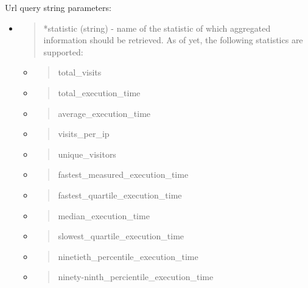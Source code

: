 Url query string parameters:

\begin{itemize}
\item
  \begin{quote}
  *statistic (string) - name of the statistic of which aggregated
  information should be retrieved. As of yet, the following statistics
  are supported:
  \end{quote}

  \begin{itemize}
  \item
    \begin{quote}
    total\_visits
    \end{quote}
  \item
    \begin{quote}
    total\_execution\_time
    \end{quote}
  \item
    \begin{quote}
    average\_execution\_time
    \end{quote}
  \item
    \begin{quote}
    visits\_per\_ip
    \end{quote}
  \item
    \begin{quote}
    unique\_visitors
    \end{quote}
  \item
    \begin{quote}
    fastest\_measured\_execution\_time
    \end{quote}
  \item
    \begin{quote}
    fastest\_quartile\_execution\_time
    \end{quote}
  \item
    \begin{quote}
    median\_execution\_time
    \end{quote}
  \item
    \begin{quote}
    slowest\_quartile\_execution\_time
    \end{quote}
  \item
    \begin{quote}
    ninetieth\_percentile\_execution\_time
    \end{quote}
  \item
    \begin{quote}
    ninety-ninth\_percientile\_execution\_time

\end{quote}
\end{itemize}
\end{itemize}
